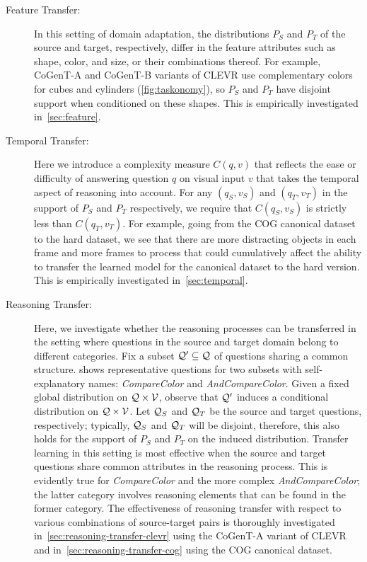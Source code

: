\begin{description}
	\item[Feature Transfer:] In this setting of domain adaptation, 
	the distributions $P_S$ and $P_T$ of the source and target, respectively, differ in the feature attributes such as shape, color, and size, or their combinations
	thereof.
	For example, CoGenT-A and CoGenT-B variants of CLEVR use complementary colors
	for cubes and cylinders (\cref{fig:taskonomy}), so $P_S$ and $P_T$ have disjoint support when conditioned on these shapes. This is empirically investigated in~\cref{sec:feature}.
		
	\item[Temporal Transfer:] Here we introduce a complexity measure $C(q,v)$ that reflects the ease or difficulty of answering question $q$ on 
	visual input $v$ that takes the temporal aspect of reasoning into account.
	For any $(q_S,v_S)$ and $(q_T,v_T)$ in the support of $P_S$ and $P_T$ respectively, we require that $C(q_S,v_S)$ is strictly less than $C(q_T,v_T)$.
	For example, going from the COG canonical dataset to the hard dataset, we see that there are more distracting objects in each frame and more frames to process that could cumulatively affect the ability to transfer the learned model for the canonical dataset to the hard version. This is empirically investigated in~\cref{sec:temporal}.	
	
	\item[Reasoning Transfer:]
	Here, we investigate whether the reasoning processes can be transferred in the setting where questions in the source and target domain belong to different categories.
	Fix a subset $\mathcal{Q}' \subseteq \mathcal{Q}$ of questions sharing a common structure.
	 shows representative questions for two subsets with  self-explanatory names: \textit{CompareColor} and \textit{AndCompareColor}.
	Given a fixed global distribution on $\mathcal{Q} \times \mathcal{V}$, observe that
	$\mathcal{Q}'$ induces a conditional distribution on $\mathcal{Q} \times \mathcal{V}$.
	Let $\mathcal{Q}_S$ and $\mathcal{Q}_T$ be the source and target questions, respectively; typically, $\mathcal{Q}_S$ and $\mathcal{Q}_T$ will be disjoint, therefore, this also holds for the support of $P_S$ and $P_T$ on the induced distribution.
	Transfer learning in this setting is most effective when the source and target questions
	share common attributes in the reasoning process. This is evidently true for \textit{CompareColor} and the more complex \textit{AndCompareColor}; the latter category involves reasoning elements that can be found in the former category. The effectiveness of reasoning transfer with respect to various combinations of source-target pairs is thoroughly investigated in~\cref{sec:reasoning-transfer-clevr} using the CoGenT-A variant of CLEVR and in~\cref{sec:reasoning-transfer-cog} using the COG canonical dataset.
	


\end{description}

